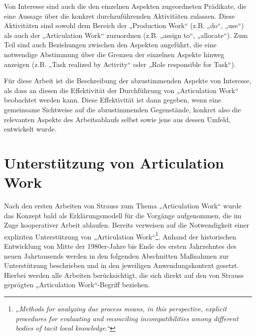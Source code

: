 Von Interesse sind auch die den einzelnen Aspekten zugeordneten Prädikate, die eine Aussage über die konkret durchzuführenden Aktivitäten zulassen. Diese Aktivitäten sind sowohl dem Bereich der „Production Work“ (z.B. „do“, „use“) als auch der „Articulation Work“ zuzuordnen (z.B. „assign to“, „allocate“). Zum Teil sind auch Beziehungen zwischen den Aspekten angeführt, die eine notwendige Abstimmung über die Grenzen der einzelnen Aspekte hinweg anzeigen (z.B. „Task realized by Activity“ oder „Role responsible for Task“).

Für diese Arbeit ist die Beschreibung der abzustimmenden Aspekte von Interesse, als dass an diesen die Effektivität der Durchführung von „Articulation Work“ beobachtet werden kann. Diese Effektivität ist dann gegeben, wenn eine gemeinsame Sichtweise auf die abzustimmenden Gegenstände, konkret also die relevanten Aspekte des Arbeitsablaufs selbst sowie jene aus dessen Umfeld, entwickelt wurde.


\section{Unterstützung von Articulation Work} %
\label{sec:unterstützung_von_articulation_work}

Nach den ersten Arbeiten von Strauss zum Thema „Articulation Work“ wurde das Konzept bald als Erklärungsmodell für die Vorgänge aufgenommen, die im Zuge kooperativer Arbeit ablaufen. Bereits \citeyear{Gerson86} verweisen \citeauthor{Gerson86} auf die Notwendigkeit einer expliziten Unterstützung von „Articulation Work“\footnote{\emph{„Methods for analyzing 
due process means, in this perspective, explicit procedures for evaluating and reconciling incompatibilities among different bodies of tacit local knowledge.“}\citep[][S. 266]{Gerson86}}. Anhand der historischen Entwicklung von Mitte der 1980er-Jahre bis Ende des ersten Jahrzehntes des neuen Jahrtausends werden in den folgenden Abschnitten Maßnahmen zur Unterstützung beschrieben und in den jeweiligen Anwendungskontext gesetzt. Hierbei werden alle Arbeiten berücksichtigt, die sich direkt auf den von Strauss geprägten „Articulation Work“-Begriff beziehen. 


